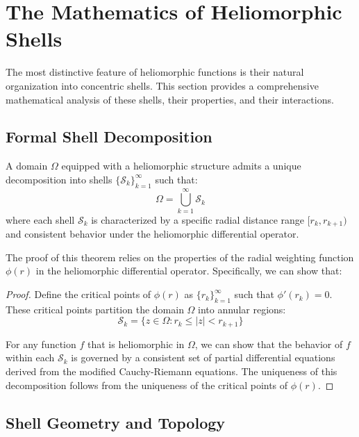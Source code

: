 \section{The Mathematics of Heliomorphic Shells}

The most distinctive feature of heliomorphic functions is their natural organization into concentric shells. This section provides a comprehensive mathematical analysis of these shells, their properties, and their interactions.

\subsection{Formal Shell Decomposition}

\begin{theorem}
A domain $\Omega$ equipped with a heliomorphic structure admits a unique decomposition into shells $\{\mathcal{S}_k\}_{k=1}^{\infty}$ such that:
\begin{equation}
\Omega = \bigcup_{k=1}^{\infty} \mathcal{S}_k
\end{equation}
where each shell $\mathcal{S}_k$ is characterized by a specific radial distance range $[r_k, r_{k+1})$ and consistent behavior under the heliomorphic differential operator.
\end{theorem}

The proof of this theorem relies on the properties of the radial weighting function $\phi(r)$ in the heliomorphic differential operator. Specifically, we can show that:

\begin{proof}
Define the critical points of $\phi(r)$ as $\{r_k\}_{k=1}^{\infty}$ such that $\phi'(r_k) = 0$. These critical points partition the domain $\Omega$ into annular regions:
\begin{equation}
\mathcal{S}_k = \{z \in \Omega : r_k \leq |z| < r_{k+1}\}
\end{equation}

For any function $f$ that is heliomorphic in $\Omega$, we can show that the behavior of $f$ within each $\mathcal{S}_k$ is governed by a consistent set of partial differential equations derived from the modified Cauchy-Riemann equations. The uniqueness of this decomposition follows from the uniqueness of the critical points of $\phi(r)$.
\end{proof}

\subsection{Shell Geometry and Topology}

